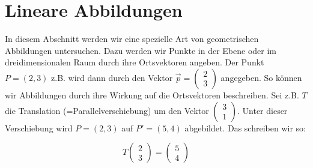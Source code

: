 
\section{Lineare Abbildungen}
In diesem Abschnitt werden wir eine spezielle Art von geometrischen Abbildungen untersuchen. Dazu werden wir Punkte in der Ebene oder im dreidimensionalen Raum durch ihre Ortsvektoren angeben. Der Punkt \( P = (2, 3) \) z.B. wird dann durch den Vektor \( \vec{p} = \begin{pmatrix} 2 \\ 3 \end{pmatrix} \) angegeben. So können wir Abbildungen durch ihre Wirkung auf die Ortsvektoren beschreiben. Sei z.B. \( T \) die Translation (=Parallelverschiebung) um den Vektor \( \begin{pmatrix} 3 \\ 1 \end{pmatrix} \). Unter dieser Verschiebung wird \( P = (2, 3) \) auf \( P' = (5, 4) \) abgebildet. Das schreiben wir so:

\[
T \begin{pmatrix} 2 \\ 3 \end{pmatrix} = \begin{pmatrix} 5 \\ 4 \end{pmatrix}
\]



\begin{center}
\end{center}

